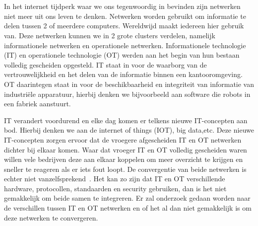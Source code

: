 
\chapter{}
\label{ch:inleiding}


In het internet tijdperk waar we ons tegenwoordig in bevinden zijn netwerken niet meer uit ons leven te denken. Netwerken worden gebruikt om informatie te delen tussen 2 of meerdere computers. Wereldwijd maakt iedereen hier gebruik van. Deze netwerken kunnen we in 2 grote clusters verdelen, namelijk informationele netwerken en operationele netwerken. Informationele technologie (IT) en operationele technologie (OT) werden aan het begin van hun bestaan volledig gescheiden opgesteld. IT staat in voor de waarborg van de vertrouwelijkheid en het delen van de informatie binnen een kantooromgeving. OT daarintegen staat in voor de beschikbaarheid en integriteit van informatie van industriële apparatuur, hierbij denken we bijvoorbeeld aan software die robots in een fabriek aanstuurt.


IT verandert voordurend en elke dag komen er telkens nieuwe IT-concepten aan bod. Hierbij denken we aan de internet of things (IOT), big data,etc. Deze nieuwe IT-concepten zorgen ervoor dat de vroegere afgescheiden IT en OT netwerken dichter bij elkaar komen. Waar dat vroeger IT en OT volledig gescheiden waren willen vele bedrijven deze aan elkaar koppelen om meer overzicht te krijgen en sneller te reageren als er iets fout loopt. De convergentie van beide netwerken is echter niet vanzelfsprekend~\autocite{Hayes2020}. Het kan zo zijn dat IT en OT verschillende hardware, protocollen, standaarden en security gebruiken, dan is het niet gemakkelijk om beide samen te integreren. Er zal onderzoek gedaan worden naar de verschillen tussen IT en OT netwerken en of het al dan niet gemakkelijk is om deze netwerken te convergeren.




